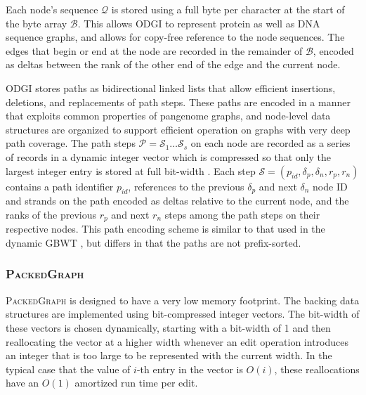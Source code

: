 \documentclass[11pt]{ucthesis}
\begin{document}
Each node's sequence $\mathcal{Q}$ is stored using a full byte per character at the start of the byte array $\mathcal{B}$.
This allows \textsc{ODGI} to represent protein as well as DNA sequence graphs, and allows for copy-free reference to the node sequences. %
The edges that begin or end at the node are recorded in the remainder of $\mathcal{B}$, encoded as deltas between the rank of the other end of the edge and the current node. 

\textsc{ODGI} stores paths as bidirectional linked lists that allow efficient insertions, deletions, and replacements of path steps.
These paths are encoded in a manner that exploits common properties of pangenome graphs, and node-level data structures are organized to support efficient operation on graphs with very deep path coverage.
The path steps $\mathcal{P} = \mathcal{S}_1 \ldots \mathcal{S}_{s}$ on each node are recorded as a series of records in a dynamic integer vector which is compressed so that only the largest integer entry is stored at full bit-width \cite{prezza2017framework}.
Each step $\mathcal{S} = (p_{id}, \delta_p, \delta_n, r_p, r_n)$ contains a path identifier $p_{id}$, references to the previous $\delta_p$ and next $\delta_n$ node ID and strands on the path encoded as deltas relative to the current node, and the ranks of the previous $r_p$ and next $r_n$ steps among the path steps on their respective nodes.
This path encoding scheme is similar to that used in the dynamic GBWT \cite{siren2020haplotype}, but differs in that the paths are not prefix-sorted.




\subsubsection{\textsc{PackedGraph}}

\textsc{PackedGraph} is designed to have a very low memory footprint.
The backing data structures are implemented using bit-compressed integer vectors.
The bit-width of these vectors is chosen dynamically, starting with a bit-width of 1 and  then reallocating the vector at a higher width whenever an edit operation introduces an integer that is too large to be represented with the current width.
In the typical case that the value of $i$-th entry in the vector is $O(i)$, these reallocations have an  $O(1)$ amortized run time per edit.
\end{document}
